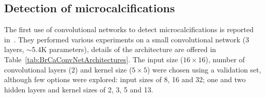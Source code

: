 \subsection{Detection of microcalcifications}
\begin{comment}
- detect microcalcifications
- only years after lecun showed it to be good on the mnist dataset.
- preselected images
- Background removal with wavelet high pass filtering ("a three-level wavelet transform was used and only the lowest frequency was eliminated for high-pass filtering before image reconstruction."). For lung nodules: Background removal like constrast enhancement.
- YES/NO output. For lung nodules: degrees of sensitivity in output(1-10) instead of disease/no disease . 
- Rotation and translation invariance. 0,90,180,270 and flipped over. (all of this on the small 32 by 32 images). No use of translation, it talks about it, though.
- Uses ROC/AUC.
- Each pixel represented 0.105 mm. (for instance 16 pixel input was 1.7mm)
- Same set used for validation and test
- using the data augmented versions one after the other in training gives better performance here (not sure why)
- 30-fold crossvalidation results reported (no test set): 0.89 AUC for individual miscrocalcifications and 0.97 for clustered microcalcif. 
- not quite clear if label were beningn/malign, microcalc/non-microcalc. It hink it is detection not diagonsis
- not clear how they measure the detection of microcalc. I think, of those microcalc detected from the normal algorithm if more than 3 were in the same 1 cm^2 area, it was considered as if the convnet detcted a cluster. 
- Easier to detect clusters these way because there could be 20 micorcalcif in a 1 cm^2 area and it only needs to detect 3.
- Bunch of questions on how on hell is this done. It could be done in a way that would help a lot the results, maybe that is why they have 0.97 AUC
\end{comment}
The first use of convolutional networks to detect microcalcifications is reported in~\cite{Lo1995}. They performed various experiments on a small convolutional network (3 layers, $\sim$5.4K parameters), details of the architecture are offered in Table~\ref{tab:BrCaConvNetArchitectures}. The input size ($16\times 16$), number of convolutional layers ($2$) and kernel size ($5\times5$) were chosen using a validation set, although few options were explored: input sizes of 8, 16 and 32; one and two hidden layers and kernel sizes of 2, 3, 5 and 13.
